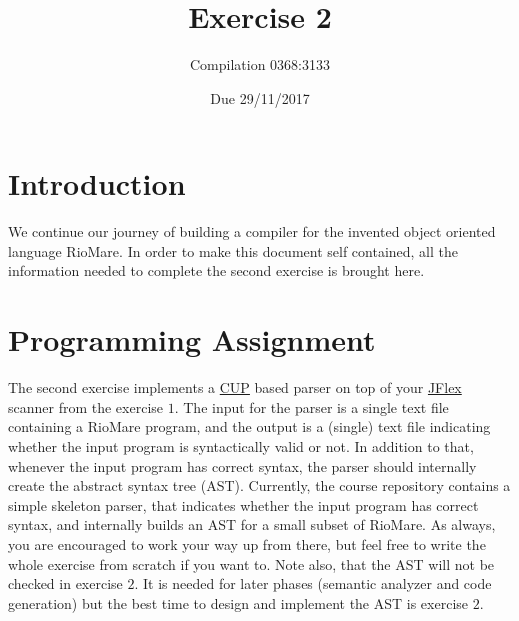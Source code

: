 \documentclass{article}
\begin{document}
\title{Exercise 2}

\author{Compilation 0368:3133}

\date{Due 29/11/2017}

\maketitle

\section{Introduction}
We continue our journey of building a compiler
for the invented object oriented language RioMare.
In order to make this document self contained,
all the information needed to complete the second exercise is brought here.
\section{Programming Assignment}
The second exercise implements a \href{http://www2.cs.tum.edu/projects/cup/}{CUP} based
parser on top of your \href{http://jflex.de/}{JFlex} scanner from the exercise $1$.
The input for the parser is a single text file containing a RioMare program,
and the output is a (single) text file indicating whether the input program
is syntactically valid or not. In addition to that,
whenever the input program has correct syntax,
the parser should internally create the abstract syntax tree (AST).
Currently, the course repository contains a simple skeleton
parser, that indicates whether the input program has correct syntax,
and internally builds an AST for a small subset of RioMare.
As always, you are encouraged to work your way up from there,
but feel free to write the whole exercise from scratch if you want to.
Note also, that the AST will not be checked in exercise $2$.
It is needed for later phases (semantic analyzer and code generation)
but the best time to design and implement the AST is exercise $2$.
\end{document}

